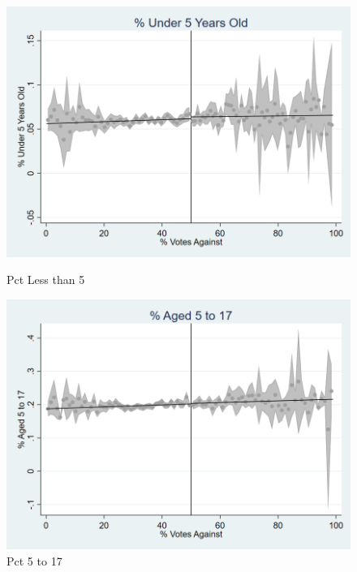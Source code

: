 \begin{figure}[ht]
    \begin{minipage}[b]{0.40\textwidth}
        \centering
        \includegraphics[width=\textwidth,keepaspectratio]{images/cov_smoothness_pctlt5.png}
        \caption*{Pct Less than 5}
        \label{fig:pctlt5_sm}
    \end{minipage}
    \hfill
    \begin{minipage}[b]{0.40\textwidth}
        \centering
        \includegraphics[width=\textwidth,keepaspectratio]{images/cov_smoothness_pct5to17.png}
        \caption*{Pct 5 to 17}
        \label{fig:pct5to17_sm}
    \end{minipage}
    
    \vspace{1em}
    

\end{figure}
